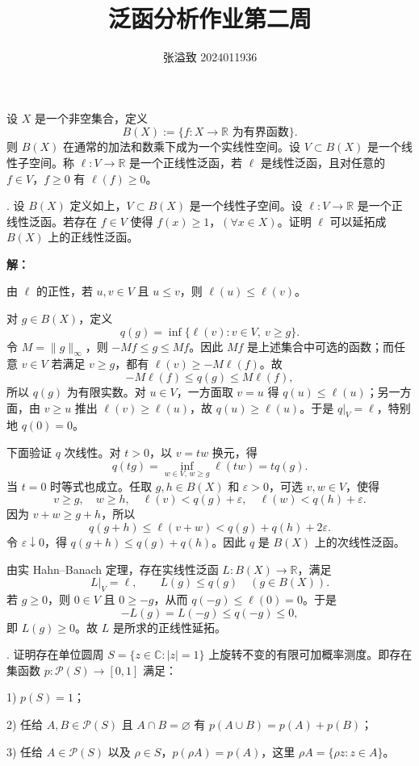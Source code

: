 \documentclass{article}
\title{泛函分析作业第二周}
\author{张溢致 2024011936}
\date{}
\begin{document}
\maketitle

设 $X$ 是一个非空集合，定义
\[
B(X):=\{f:X\to\mathbb R\text{ 为有界函数}\}.
\]
则 $B(X)$ 在通常的加法和数乘下成为一个实线性空间。设 $V\subset B(X)$ 是一个线性子空间。称 $\ell:V\to\mathbb R$ 是一个正线性泛函，若 $\ell$ 是线性泛函，且对任意的 $f\in V$，$f\ge0$ 有 $\ell(f)\ge0$。

\medskip
{}. 设 $B(X)$ 定义如上，$V\subset B(X)$ 是一个线性子空间。设 $\ell:V\to\mathbb R$ 是一个正线性泛函。若存在 $f\in V$ 使得 $f(x)\ge1$，$(\forall x\in X)$。证明 $\ell$ 可以延拓成 $B(X)$ 上的正线性泛函。

\textbf{解：}


由 $\ell$ 的正性，若 $u,v\in V$ 且 $u\le v$，则 $\ell(u)\le\ell(v)$。

对 $g\in B(X)$，定义
\[
q(g)=\inf\{\ell(v):v\in V,\ v\ge g\}.
\]
令 $M=\|g\|_\infty$，则 $-Mf\le g\le Mf$。因此 $Mf$ 是上述集合中可选的函数；而任意 $v\in V$ 若满足 $v\ge g$，都有 $\ell(v)\ge-M\ell(f)$。故
\[
-M\ell(f)\le q(g)\le M\ell(f),
\]
所以 $q(g)$ 为有限实数。对 $u\in V$，一方面取 $v=u$ 得 $q(u)\le\ell(u)$；另一方面，由 $v\ge u$ 推出 $\ell(v)\ge\ell(u)$，故 $q(u)\ge\ell(u)$。于是 $q|_V=\ell$，特别地 $q(0)=0$。

下面验证 $q$ 次线性。对 $t>0$，以 $v=tw$ 换元，得
\[
q(tg)=\inf_{w\in V,\,w\ge g}\ell(tw)=tq(g).
\]
当 $t=0$ 时等式也成立。任取 $g,h\in B(X)$ 和 $\varepsilon>0$，可选 $v,w\in V$，使得
\[
v\ge g,\quad w\ge h,\quad
\ell(v)<q(g)+\varepsilon,\quad\ell(w)<q(h)+\varepsilon.
\]
因为 $v+w\ge g+h$，所以
\[
q(g+h)\le\ell(v+w)<q(g)+q(h)+2\varepsilon.
\]
令 $\varepsilon\downarrow0$，得 $q(g+h)\le q(g)+q(h)$。因此 $q$ 是 $B(X)$ 上的次线性泛函。

由实 Hahn--Banach 定理，存在实线性泛函 $L:B(X)\to\mathbb R$，满足
\[
L|_V=\ell,\qquad L(g)\le q(g)\quad(g\in B(X)).
\]
若 $g\ge0$，则 $0\in V$ 且 $0\ge-g$，从而 $q(-g)\le\ell(0)=0$。于是
\[
-L(g)=L(-g)\le q(-g)\le0,
\]
即 $L(g)\ge0$。故 $L$ 是所求的正线性延拓。

\medskip
{}. 证明存在单位圆周 $S=\{z\in\mathbb C:|z|=1\}$ 上旋转不变的有限可加概率测度。即存在集函数 $p:\mathcal P(S)\to[0,1]$ 满足：

1) $p(S)=1$；

2) 任给 $A,B\in\mathcal P(S)$ 且 $A\cap B=\varnothing$ 有 $p(A\cup B)=p(A)+p(B)$；

3) 任给 $A\in\mathcal P(S)$ 以及 $\rho\in S$，$p(\rho A)=p(A)$，这里 $\rho A=\{\rho z:z\in A\}$。
\end{document}
